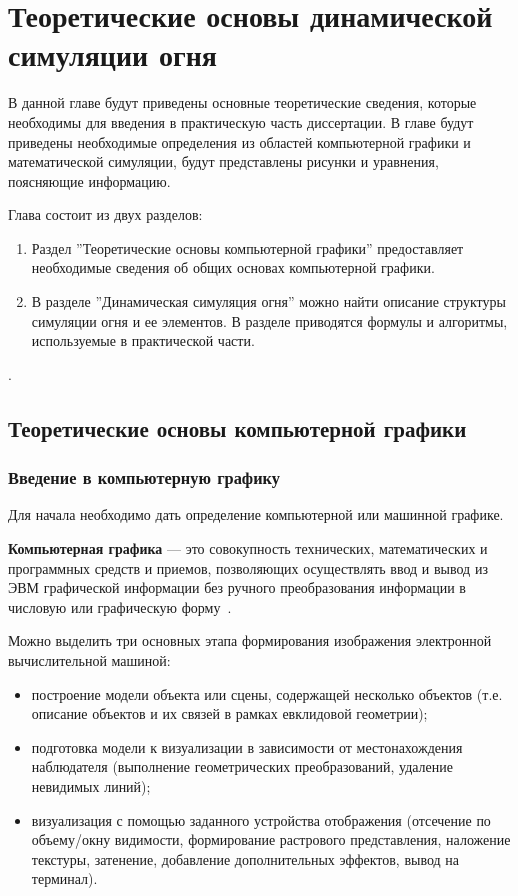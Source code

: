 \chapter{Теоретические основы динамической симуляции огня}

В данной главе будут приведены основные теоретические сведения, которые
необходимы для введения в практическую часть диссертации. В главе будут
приведены необходимые определения из областей компьютерной графики и
математической симуляции, будут представлены рисунки и уравнения, поясняющие
информацию.

Глава состоит из двух разделов:
\begin{enumerate}
    \item Раздел ''Теоретические основы компьютерной графики'' предоставляет
        необходимые сведения об общих основах компьютерной графики.
    \item В разделе ''Динамическая симуляция огня'' можно найти описание\break{}
        структуры симуляции огня и ее элементов. В разделе приводятся формулы и
        алгоритмы, используемые в практической части.
\end{enumerate}.

\section{Теоретические основы компьютерной графики}

\subsection{Введение в компьютерную графику}

Для начала необходимо дать определение компьютерной или машинной графике.

\textbf{Компьютерная графика} --- это совокупность технических, математических и
программных средств и приемов, позволяющих осуществлять ввод и вывод из ЭВМ
графической информации без ручного преобразования информации в числовую или
графическую форму~\cite{SamalGraphics}.

Можно выделить три основных этапа формирования изображения электронной
вычислительной машиной:
\begin{itemize}
    \item построение модели объекта или сцены, содержащей несколько объектов
        (т\@.е\@. описание объектов и их связей в рамках евклидовой геометрии);
    \item подготовка модели к визуализации в зависимости от местонахождения
        наблюдателя (выполнение геометрических преобразований, удаление
        невидимых линий);
    \item визуализация с помощью заданного устройства отображения (отсечение по
        объему/окну видимости, формирование растрового представления, наложение
        текстуры, затенение, добавление дополнительных эффектов, вывод на
        терминал).
\end{itemize}

